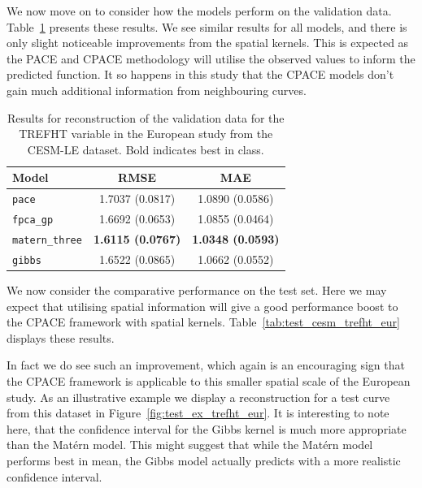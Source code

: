 We now move on to consider how the models perform on the validation data.
Table~\ref{tab:train_cesm_trefht_eur} presents these results.
We see similar results for all models, and there is only slight noticeable improvements from the spatial kernels.
This is expected as the PACE and CPACE methodology will utilise the observed values to inform the predicted function.
It so happens in this study that the CPACE models don't gain much additional information from neighbouring curves. 

\begin{table}
	\caption[Results for TREFHT variable on validation data in the European study]{Results for reconstruction of the validation data for the TREFHT variable in the European study from the CESM-LE dataset. Bold indicates best in class.}
	\centering
	\label{tab:train_cesm_trefht_eur}
	\begin{tabular}{lcc}
		\toprule
		\textbf{Model} & \textbf{RMSE} & \textbf{MAE} \\
		\midrule
		\verb*|pace| & 1.7037 (0.0817) & 1.0890	(0.0586) \\
		\verb*|fpca_gp| & 1.6692 (0.0653) & 1.0855	(0.0464) \\
		\verb*|matern_three| & \textbf{1.6115 (0.0767)} & \textbf{1.0348	(0.0593)}\\
		\verb*|gibbs| & 1.6522	(0.0865) & 1.0662 (0.0552)\\
		\bottomrule
	\end{tabular}
\end{table}

We now consider the comparative performance on the test set.
Here we may expect that utilising spatial information will give a good performance boost to the CPACE framework with spatial kernels.
Table~\ref{tab:test_cesm_trefht_eur} displays these results.

In fact we do see such an improvement, which again is an encouraging sign that the CPACE framework is applicable to this smaller spatial scale of the European study.
As an illustrative example we display a reconstruction for a test curve from this dataset in Figure~\ref{fig:test_ex_trefht_eur}.
It is interesting to note here, that the confidence interval for the Gibbs kernel is much more appropriate than the Mat\'ern model. 
This might suggest that while the Mat\'ern model performs best in mean, the Gibbs model actually predicts with a more realistic confidence interval. 


